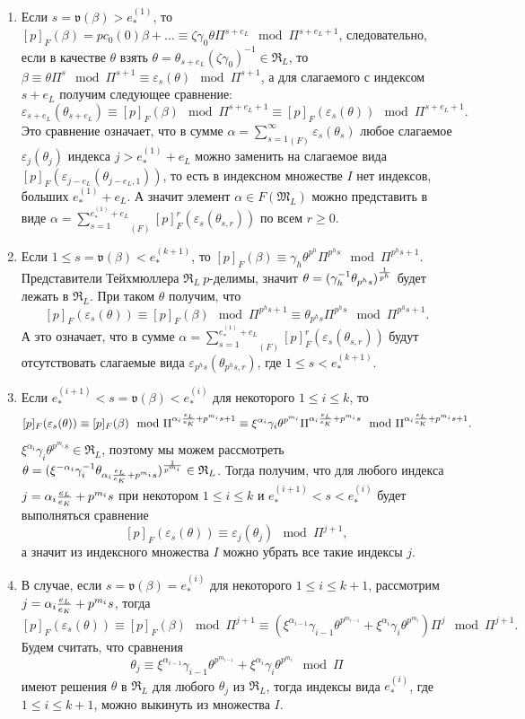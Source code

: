 \documentclass[a4paper]{article}
\newcommand{\ML}{\mathfrak{M}_L}
\newcommand{\RL}{\mathfrak{R}_L}
\newcommand{\val}{\mathfrak{v}}
\newcommand{\Leq}{\leqslant}
\newcommand{\Geq}{\geqslant}
\begin{document}
\begin{enumerate}
	\item Если $s=\val(\beta)>e_*^{(1)}$, то $[p]_F(\beta)=pc_0(0)\beta+\dots\equiv\zeta \gamma_0\theta\Pi^{s+e_L}\mod\Pi^{s+e_L+1}$, следовательно, если в качестве $\theta$ взять $\theta=\theta_{s+e_L}(\zeta \gamma_0)^{-1}\in\RL$, то $\beta\equiv\theta\Pi^{s}\mod\Pi^{s+1}\equiv\varepsilon_{s}(\theta)\mod\Pi^{s+1}$, а для слагаемого с индексом $s+e_L$ получим следующее сравнение:
	$$\varepsilon_{s+e_L}(\theta_{s+e_L})\equiv[p]_F(\beta)\mod\Pi^{s+e_L+1}\equiv[p]_F(\varepsilon_s(\theta))\mod\Pi^{s+e_L+1}.$$
	Это сравнение означает, что в сумме $\alpha={\sum\limits_{s=1}^\infty}_{(F)}\varepsilon_s(\theta_s)$ любое слагаемое $\varepsilon_j(\theta_j)$ индекса $j>e_*^{(1)}+e_L$ можно заменить на слагаемое вида $[p]_F(\varepsilon_{j-e_L}(\theta_{j-e_L,1}))$, то есть в индексном множестве $I$ нет индексов, больших $e_*^{(1)}+e_L$. А значит элемент $\alpha \in F(\ML)$ можно представить в виде $\alpha = {\sum\limits_{s=1}^{e_*^{(1)} + e_L}}_{(F)}[p]_F^r(\varepsilon_s(\theta_{s,r}))$ по всем $r \Geq 0$.
	\item Если $1 \Leq s= \val(\beta) < e_*^{(k+1)}$, то $[p]_F(\beta) \equiv \gamma_h\theta^{p^h}\Pi^{p^hs}\mod\Pi^{p^hs+1}$. Представители Тейхмюллера $\RL\ p$-делимы, значит $\theta=(\gamma_h^{-1}\theta_{p^hs})^{1\over p^h}$ будет лежать в $\RL$. При таком $\theta$ получим, что
	$$[p]_F(\varepsilon_s(\theta))\equiv[p]_F(\beta)\mod\Pi^{p^hs+1}\equiv\theta_{p^hs}\Pi^{p^hs}\mod\Pi^{p^hs+1}.$$
	А это означает, что в сумме $\alpha={\sum\limits_{s=1}^{e_*^{(1)} + e_L}}_{(F)}[p]_F^r(\varepsilon_s(\theta_{s,r}))$ будут отсутствовать слагаемые вида $\varepsilon_{p^hs}(\theta_{p^hs,r})$, где $1 \Leq s < e_*^{(k+1)}$.
	\item Если $e_*^{(i+1)}<s=\val(\beta)<e_*^{(i)}$ для некоторого $1\Leq i\Leq k$, то
	$$[p]_F(\varepsilon_s(\theta))\equiv[p]_F(\beta)\mod\Pi^{\alpha_i{e_L \over e_K}+p^{m_i}s+1} \equiv \xi^{\alpha_i}\gamma_i\theta^{p^{m_i}}\Pi^{\alpha_i{e_L \over e_K}+p^{m_i}s}\mod\Pi^{\alpha_i{e_L\over e_K}+p^{m_i}s+1}.$$
	$\xi^{\alpha_i}\gamma_i\theta^{p^{m_i}s}\in\RL$, поэтому мы можем рассмотреть $\theta=(\xi^{-\alpha_i}\gamma_i^{-1}\theta_{\alpha_i{e_L \over e_K}+p^{m_i}s})^{1\over p^{m_i}}\in\RL$. Тогда получим, что для любого индекса $j=\alpha_i{e_L\over e_K}+p^{m_i}s$ при некотором $1\Leq i\Leq k$ и $e_*^{(i+1)}<s<e_*^{(i)}$ будет выполняться сравнение
	$$[p]_F(\varepsilon_s(\theta))\equiv\varepsilon_j(\theta_j)\mod\Pi^{j+1},$$
	а значит из индексного множества $I$ можно убрать все такие индексы $j$.
	\item В случае, если $s=\val(\beta)=e_*^{(i)}$ для некоторого $1\Leq i\Leq k+1$, рассмотрим $j=\alpha_i{e_L \over e_K}+p^{m_i}s$, тогда
	$$[p]_F(\varepsilon_s(\theta))\equiv[p]_F(\beta)\mod\Pi^{j+1} \equiv (\xi^{\alpha_{i-1}}\gamma_{i-1}\theta^{p^{m_{i-1}}}+\xi^{\alpha_i}\gamma_i\theta^{p^{m_i}})\Pi^j\mod\Pi^{j+1}.$$
	Будем считать, что сравнения
	$$\theta_j\equiv \xi^{\alpha_{i-1}}\gamma_{i-1}\theta^{p^{m_{i-1}}}+\xi^{\alpha_i}\gamma_i\theta^{p^{m_i}}\mod\Pi$$
	имеют решения $\theta$ в $\RL$ для любого $\theta_j$ из $\RL$, тогда индексы вида $e_*^{(i)}$, где $1\Leq i\Leq k+1$, можно выкинуть из множества $I$.
\end{enumerate}
\end{document}
